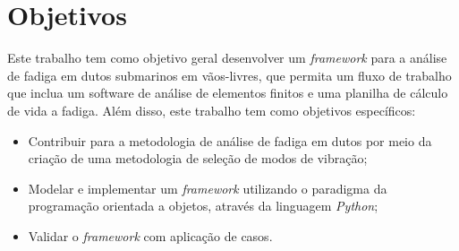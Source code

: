 % 


\section{Objetivos}

Este trabalho tem como objetivo geral desenvolver um \textit{framework} para a análise de fadiga em dutos submarinos em vãos-livres, que permita um fluxo de trabalho que inclua um software de análise de elementos finitos e uma planilha de cálculo de vida a fadiga.
Além disso, este trabalho tem como objetivos específicos:

\begin{itemize}
    \item Contribuir para a metodologia de análise de fadiga em dutos por meio da criação de uma metodologia de seleção de modos de vibração;
    \item Modelar e implementar um \textit{framework} utilizando o paradigma da programação orientada a objetos, através da linguagem \textit{Python};
    \item Validar o \textit{framework}  com aplicação de casos.
\end{itemize}

% 